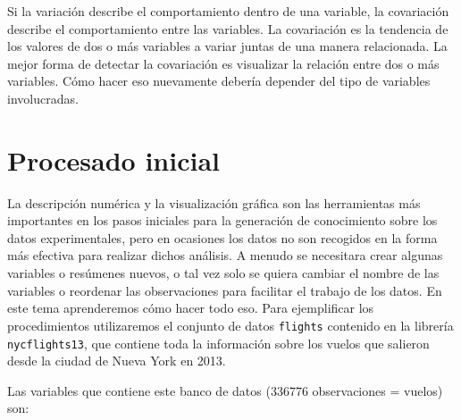 \documentclass[
]{book}
\begin{document}
Si la variación describe el comportamiento dentro de una variable, la covariación describe el comportamiento entre las variables. La covariación es la tendencia de los valores de dos o más variables a variar juntas de una manera relacionada. La mejor forma de detectar la covariación es visualizar la relación entre dos o más variables. Cómo hacer eso nuevamente debería depender del tipo de variables involucradas.

\hypertarget{procesado-inicial}{%
\section{Procesado inicial}\label{procesado-inicial}}

La descripción numérica y la visualización gráfica son las herramientas más importantes en los pasos iniciales para la generación de conocimiento sobre los datos experimentales, pero en ocasiones los datos no son recogidos en la forma más efectiva para realizar dichos análisis. A menudo se necesitara crear algunas variables o resúmenes nuevos, o tal vez solo se quiera cambiar el nombre de las variables o reordenar las observaciones para facilitar el trabajo de los datos. En este tema aprenderemos cómo hacer todo eso. Para ejemplificar los procedimientos utilizaremos el conjunto de datos \texttt{flights} contenido en la librería \texttt{nycflights13}, que contiene toda la información sobre los vuelos que salieron desde la ciudad de Nueva York en 2013.

Las variables que contiene este banco de datos (336776 observaciones = vuelos) son:
\end{document}
